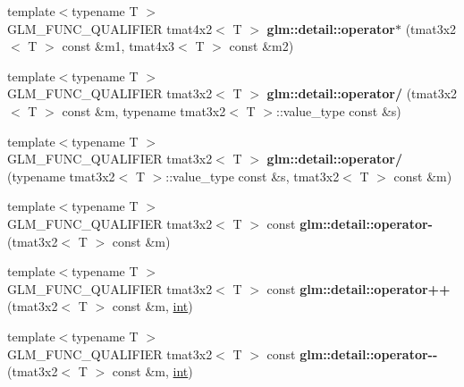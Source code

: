\begin{DoxyCompactItemize}
\item 
\hypertarget{namespaceglm_1_1detail_aa1d870dc8b77a44aeae02ffe1a36bc07}{}{\footnotesize template$<$typename T $>$ }\\G\+L\+M\+\_\+\+F\+U\+N\+C\+\_\+\+Q\+U\+A\+L\+I\+F\+I\+E\+R tmat4x2$<$ T $>$ {\bfseries glm\+::detail\+::operator$\ast$} (tmat3x2$<$ T $>$ const \&m1, tmat4x3$<$ T $>$ const \&m2)\label{namespaceglm_1_1detail_aa1d870dc8b77a44aeae02ffe1a36bc07}

\item 
\hypertarget{namespaceglm_1_1detail_abf9a2912b5030543839df113662d0687}{}{\footnotesize template$<$typename T $>$ }\\G\+L\+M\+\_\+\+F\+U\+N\+C\+\_\+\+Q\+U\+A\+L\+I\+F\+I\+E\+R tmat3x2$<$ T $>$ {\bfseries glm\+::detail\+::operator/} (tmat3x2$<$ T $>$ const \&m, typename tmat3x2$<$ T $>$\+::value\+\_\+type const \&s)\label{namespaceglm_1_1detail_abf9a2912b5030543839df113662d0687}

\item 
\hypertarget{namespaceglm_1_1detail_ab6af57d8d78531808ca7412b8b5ac4bd}{}{\footnotesize template$<$typename T $>$ }\\G\+L\+M\+\_\+\+F\+U\+N\+C\+\_\+\+Q\+U\+A\+L\+I\+F\+I\+E\+R tmat3x2$<$ T $>$ {\bfseries glm\+::detail\+::operator/} (typename tmat3x2$<$ T $>$\+::value\+\_\+type const \&s, tmat3x2$<$ T $>$ const \&m)\label{namespaceglm_1_1detail_ab6af57d8d78531808ca7412b8b5ac4bd}

\item 
\hypertarget{namespaceglm_1_1detail_a59b73f54f24948e966ad476164b9acb7}{}{\footnotesize template$<$typename T $>$ }\\G\+L\+M\+\_\+\+F\+U\+N\+C\+\_\+\+Q\+U\+A\+L\+I\+F\+I\+E\+R tmat3x2$<$ T $>$ const {\bfseries glm\+::detail\+::operator-\/} (tmat3x2$<$ T $>$ const \&m)\label{namespaceglm_1_1detail_a59b73f54f24948e966ad476164b9acb7}

\item 
\hypertarget{namespaceglm_1_1detail_afbedf96a311aecbfd5298ea7ade78b1a}{}{\footnotesize template$<$typename T $>$ }\\G\+L\+M\+\_\+\+F\+U\+N\+C\+\_\+\+Q\+U\+A\+L\+I\+F\+I\+E\+R tmat3x2$<$ T $>$ const {\bfseries glm\+::detail\+::operator++} (tmat3x2$<$ T $>$ const \&m, \hyperlink{_s_d_l__thread_8h_a6a64f9be4433e4de6e2f2f548cf3c08e}{int})\label{namespaceglm_1_1detail_afbedf96a311aecbfd5298ea7ade78b1a}

\item 
\hypertarget{namespaceglm_1_1detail_a3643210bac979028c8ee5f440d9d6cab}{}{\footnotesize template$<$typename T $>$ }\\G\+L\+M\+\_\+\+F\+U\+N\+C\+\_\+\+Q\+U\+A\+L\+I\+F\+I\+E\+R tmat3x2$<$ T $>$ const {\bfseries glm\+::detail\+::operator-\/-\/} (tmat3x2$<$ T $>$ const \&m, \hyperlink{_s_d_l__thread_8h_a6a64f9be4433e4de6e2f2f548cf3c08e}{int})\label{namespaceglm_1_1detail_a3643210bac979028c8ee5f440d9d6cab}


\end{DoxyCompactItemize}
